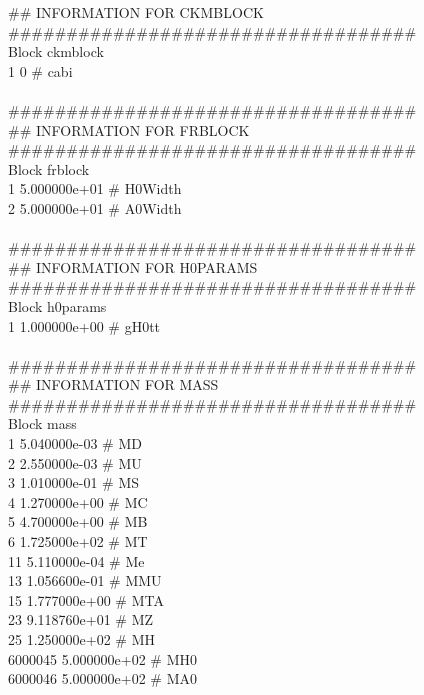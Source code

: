 {\#\# INFORMATION FOR CKMBLOCK\\
\#\#\#\#\#\#\#\#\#\#\#\#\#\#\#\#\#\#\#\#\#\#\#\#\#\#\#\#\#\#\#\#\#\#\#\\
Block ckmblock \\
    1 0            \# cabi \\
\\
\#\#\#\#\#\#\#\#\#\#\#\#\#\#\#\#\#\#\#\#\#\#\#\#\#\#\#\#\#\#\#\#\#\#\#\\
\#\# INFORMATION FOR FRBLOCK\\
\#\#\#\#\#\#\#\#\#\#\#\#\#\#\#\#\#\#\#\#\#\#\#\#\#\#\#\#\#\#\#\#\#\#\#\\
Block frblock \\
    1 5.000000e+01 \# H0Width\\ 
    2 5.000000e+01 \# A0Width \\
\\
\#\#\#\#\#\#\#\#\#\#\#\#\#\#\#\#\#\#\#\#\#\#\#\#\#\#\#\#\#\#\#\#\#\#\#\\
\#\# INFORMATION FOR H0PARAMS\\
\#\#\#\#\#\#\#\#\#\#\#\#\#\#\#\#\#\#\#\#\#\#\#\#\#\#\#\#\#\#\#\#\#\#\#\\
Block h0params \\
    1 1.000000e+00 \# gH0tt\\ 
\\
\#\#\#\#\#\#\#\#\#\#\#\#\#\#\#\#\#\#\#\#\#\#\#\#\#\#\#\#\#\#\#\#\#\#\#\\
\#\# INFORMATION FOR MASS\\
\#\#\#\#\#\#\#\#\#\#\#\#\#\#\#\#\#\#\#\#\#\#\#\#\#\#\#\#\#\#\#\#\#\#\#\\
Block mass \\
    1 5.040000e-03 \# MD \\
    2 2.550000e-03 \# MU \\
    3 1.010000e-01 \# MS \\
    4 1.270000e+00 \# MC \\
    5 4.700000e+00 \# MB \\
    6 1.725000e+02 \# MT \\
   11 5.110000e-04 \# Me \\
   13 1.056600e-01 \# MMU \\
   15 1.777000e+00 \# MTA \\
   23 9.118760e+01 \# MZ \\
   25 1.250000e+02 \# MH \\
  6000045 5.000000e+02 \# MH0\\ 
  6000046 5.000000e+02 \# MA0 \\
}
